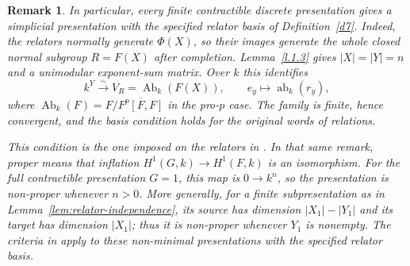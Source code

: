 \documentclass[11pt,a4paper]{article}
\newtheorem{remark}[theorem]{Remark}
\begin{document}
\begin{remark}
In particular, every finite contractible discrete presentation gives a
simplicial presentation with the specified relator basis of
Definition~\ref{d7}.  Indeed, the relators normally generate
$\Phi(X)$, so their images generate the whole closed normal subgroup
$R=F(X)$ after completion.  Lemma~\ref{l.1.3} gives
$|X|=|Y|=n$ and a unimodular exponent-sum matrix.  Over $k$ this
identifies
\[
 k^Y\xrightarrow{\sim}V_R=\operatorname{Ab}_k(F(X)),
 \qquad e_y\longmapsto\operatorname{ab}_k(r_y),
\]
where $\operatorname{Ab}_k(F)=F/\overline{F^p[F,F]}$ in the
pro-$p$ case.  The family is finite, hence convergent, and the basis
condition holds for the original words of relations.

This condition is the one imposed on the relators in
\cite[Section~4.5, Remark~9]{Mikh2023}.  In that same remark,
\emph{proper} means that inflation $H^1(G,k)\to H^1(F,k)$ is an
isomorphism.  For the full contractible presentation $G=1$, this map
is $0\to k^n$, so the presentation is non-proper whenever $n>0$.
More generally, for a finite subpresentation as in
Lemma~\ref{lem:relator-independence}, its source has dimension
$|X_1|-|Y_1|$ and its target has dimension $|X_1|$; thus it is
non-proper whenever $Y_1$ is nonempty.  The criteria in
\cite[Propositions~15 and~16]{Mikh2023} apply to these non-minimal
presentations with the specified relator basis.
\end{remark}
\end{document}
